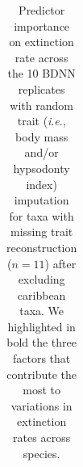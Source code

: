\documentclass[
  9pt,
  letterpaper,
]{article}
\begin{document}
\begin{longtable}[]{@{}
  >{\centering\arraybackslash}p{}
  >{\centering\arraybackslash}p{}
  >{\centering\arraybackslash}p{}
  >{\centering\arraybackslash}p{}
  >{\centering\arraybackslash}p{}
  >{\centering\arraybackslash}p{}
  >{\centering\arraybackslash}p{}
  >{\centering\arraybackslash}p{}
  >{\centering\arraybackslash}p{}
  >{\centering\arraybackslash}p{}
  >{\centering\arraybackslash}p{}
  >{\centering\arraybackslash}p{}
  >{\centering\arraybackslash}p{}@{}}

\caption{\label{tbl-pred_imp_ex}Predictor importance on extinction rate
across the 10 BDNN replicates with random trait (\emph{i}.\emph{e}.,
body mass and/or hypsodonty index) imputation for taxa with missing
trait reconstruction (\(n=11\)) after excluding caribbean taxa. We
highlighted in bold the three factors that contribute the most to
variations in extinction rates across species.}

\tabularnewline


\end{longtable}
\end{document}
